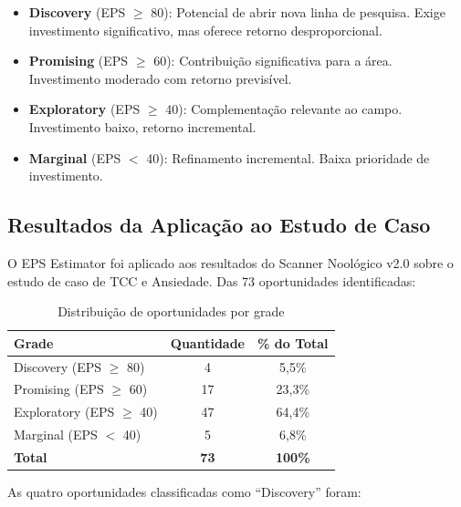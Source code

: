 \documentclass[12pt,a4paper]{article}
\begin{document}
\begin{itemize}[itemsep=1pt]
  \item \textbf{Discovery} (EPS $\geq$ 80): Potencial de abrir nova linha de pesquisa. Exige investimento significativo, mas oferece retorno desproporcional.
  \item \textbf{Promising} (EPS $\geq$ 60): Contribuição significativa para a área. Investimento moderado com retorno previsível.
  \item \textbf{Exploratory} (EPS $\geq$ 40): Complementação relevante ao campo. Investimento baixo, retorno incremental.
  \item \textbf{Marginal} (EPS $<$ 40): Refinamento incremental. Baixa prioridade de investimento.
\end{itemize}

\subsection{Resultados da Aplicação ao Estudo de Caso}

O EPS Estimator foi aplicado aos resultados do Scanner Noológico v2.0 sobre o estudo de caso de TCC e Ansiedade. Das 73 oportunidades identificadas:

\begin{table}[H]
  \centering
  \caption{Distribuição de oportunidades por grade}
  \begin{tabular}{l c c}
    \toprule
    \textbf{Grade} & \textbf{Quantidade} & \textbf{\% do Total} \\
    \midrule
    Discovery (EPS $\geq$ 80)  & 4  & 5,5\% \\
    Promising (EPS $\geq$ 60)  & 17 & 23,3\% \\
    Exploratory (EPS $\geq$ 40) & 47 & 64,4\% \\
    Marginal (EPS $<$ 40)      & 5  & 6,8\% \\
    \textbf{Total}             & \textbf{73} & \textbf{100\%} \\
    \bottomrule
  \end{tabular}
\end{table}

As quatro oportunidades classificadas como ``Discovery'' foram:
\end{document}
